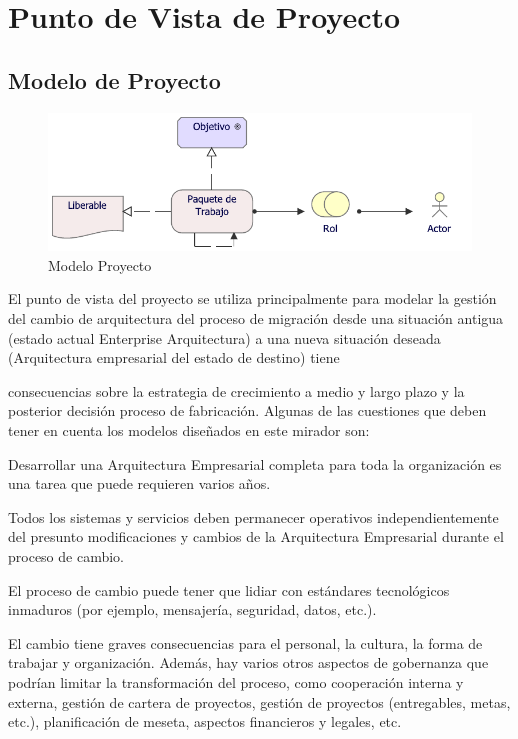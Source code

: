 \section{Punto de Vista de Proyecto}
\subsection{Modelo de Proyecto}
\begin{figure}[h!]
	\centering
	\includegraphics[width=.9\linewidth]{imgs/modelo/Proyecto}
	\caption{Modelo Proyecto}
\end{figure}
El punto de vista del proyecto se utiliza principalmente para modelar la gestión del cambio de arquitectura del proceso de migración desde una situación antigua (estado actual Enterprise
Arquitectura) a una nueva situación deseada (Arquitectura empresarial del estado de destino) tiene

consecuencias sobre la estrategia de crecimiento a medio y largo plazo y la posterior decisión
proceso de fabricación.  Algunas de las cuestiones que deben tener en cuenta los modelos diseñados en
este mirador son:

Desarrollar una Arquitectura Empresarial completa para toda la organización es una tarea que puede
 requieren varios años.

Todos los sistemas y servicios deben permanecer operativos independientemente del presunto modificaciones y cambios de la Arquitectura Empresarial durante el proceso de cambio.

El proceso de cambio puede tener que lidiar con estándares tecnológicos inmaduros (por ejemplo,
mensajería, seguridad, datos, etc.).

El cambio tiene graves consecuencias para el personal, la cultura, la forma de trabajar y
organización. Además, hay varios otros aspectos de gobernanza que podrían limitar la transformación del proceso, como cooperación interna y externa, gestión de cartera de proyectos, gestión de proyectos (entregables, metas, etc.), planificación de meseta, aspectos financieros y legales, etc.

